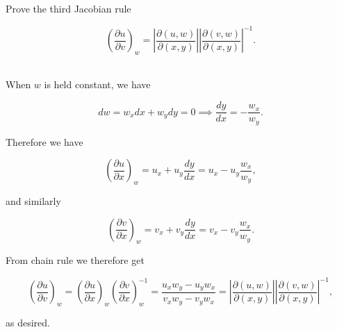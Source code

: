 \documentclass[english,a4paper,12pt]{report}
\begin{document}
{Prove the third Jacobian rule

\begin{equation}
	\left( \frac{\partial u}{\partial v} \right)_{w} = \left| \frac{\partial (u,w)}{\partial (x,y)}\right| \left|\frac{\partial (v,w)}{\partial (x,y)}\right|^{-1} .  
\end{equation}
~
}
{When \(w\) is held constant, we have

\begin{equation}
	dw = w_{x}dx+w_{y}dy =0 \implies \frac{dy}{dx} = -\frac{w_{x} }{w_{y} }.    
\end{equation}

Therefore we have 

\begin{equation}
	\left( \frac{\partial u}{\partial x} \right)_{w} = u_{x} + u_{y} \frac{dy}{dx} = u_{x} - u_{y} \frac{w_{x} }{w_{y} },      
\end{equation}

and similarly 

\begin{equation}
	\left( \frac{\partial v}{\partial x} \right)_{w} = v_{x} + v_{y}\frac{dy}{dx} = v_{x} - v_{y} \frac{w_{x} }{w_{y} }.      
\end{equation}

From chain rule we therefore get

\begin{equation}
	\left( \frac{\partial u}{\partial v} \right)_{w} = \left( \frac{\partial u}{\partial x} \right)_{w} \left( \frac{\partial v}{\partial x} \right)_{w} ^{-1} = \frac{u_{x}w_{y}-u_{y}w_{x}    }{v_{x}w_{y}-v_{y}w_{x}    } =\left| \frac{\partial (u,w)}{\partial (x,y)}\right| \left|\frac{\partial (v,w)}{\partial (x,y)}\right|^{-1},  
\end{equation}

as desired.
} 
\end{document}
